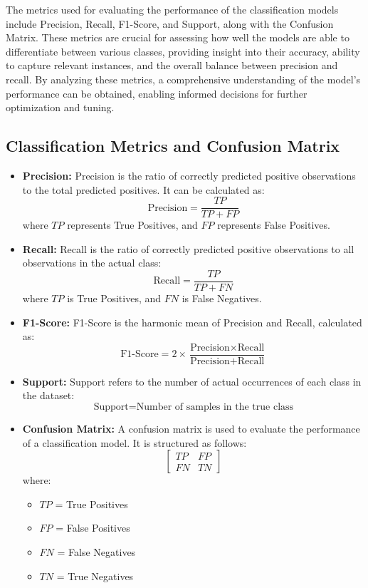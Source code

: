 \noindent
The metrics used for evaluating the performance of the classification models include Precision, Recall, F1-Score, and Support, along with the Confusion Matrix. These metrics are crucial for assessing how well the models are able to differentiate between various classes, providing insight into their accuracy, ability to capture relevant instances, and the overall balance between precision and recall. By analyzing these metrics, a comprehensive understanding of the model's performance can be obtained, enabling informed decisions for further optimization and tuning.

\subsection{Classification Metrics and Confusion Matrix}

\begin{itemize}
    \item \textbf{Precision:} Precision is the ratio of correctly predicted positive observations to the total predicted positives. It can be calculated as:
    \[
    \text{Precision} = \frac{TP}{TP + FP}
    \]
    where \( TP \) represents True Positives, and \( FP \) represents False Positives.

    \item \textbf{Recall:} Recall is the ratio of correctly predicted positive observations to all observations in the actual class:
    \[
    \text{Recall} = \frac{TP}{TP + FN}
    \]
    where \( TP \) is True Positives, and \( FN \) is False Negatives.

    \item \textbf{F1-Score:} F1-Score is the harmonic mean of Precision and Recall, calculated as:
    \[
    \text{F1-Score} = 2 \times \frac{\text{Precision} \times \text{Recall}}{\text{Precision} + \text{Recall}}
    \]

    \item \textbf{Support:} Support refers to the number of actual occurrences of each class in the dataset:
    \[
    \text{Support} = \text{Number of samples in the true class}
    \]

    \item \textbf{Confusion Matrix:} A confusion matrix is used to evaluate the performance of a classification model. It is structured as follows:
    \[
    \begin{bmatrix}
    TP & FP \\
    FN & TN
    \end{bmatrix}
    \]
    where:
    \begin{itemize}
        \item \( TP \) = True Positives
        \item \( FP \) = False Positives
        \item \( FN \) = False Negatives
        \item \( TN \) = True Negatives
    \end{itemize}
\end{itemize}

